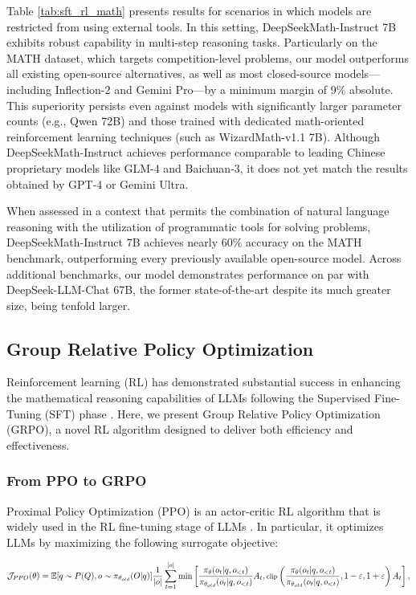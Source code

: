 \begin{itemize}[topsep=0pt]
Table \ref{tab:sft_rl_math} presents results for scenarios in which models are restricted from using external tools. In this setting, DeepSeekMath-Instruct 7B exhibits robust capability in multi-step reasoning tasks. Particularly on the MATH dataset, which targets competition-level problems, our model outperforms all existing open-source alternatives, as well as most closed-source models—including Inflection-2 and Gemini Pro—by a minimum margin of 9\% absolute. This superiority persists even against models with significantly larger parameter counts (e.g., Qwen 72B) and those trained with dedicated math-oriented reinforcement learning techniques (such as WizardMath-v1.1 7B). Although DeepSeekMath-Instruct achieves performance comparable to leading Chinese proprietary models like GLM-4 and Baichuan-3, it does not yet match the results obtained by GPT-4 or Gemini Ultra.

When assessed in a context that permits the combination of natural language reasoning with the utilization of programmatic tools for solving problems, DeepSeekMath-Instruct 7B achieves nearly 60\% accuracy on the MATH benchmark, outperforming every previously available open-source model. Across additional benchmarks, our model demonstrates performance on par with DeepSeek-LLM-Chat 67B, the former state-of-the-art despite its much greater size, being tenfold larger.

\subsection{Group Relative Policy Optimization} Reinforcement learning (RL) has demonstrated substantial success in enhancing the mathematical reasoning capabilities of LLMs following the Supervised Fine-Tuning (SFT) phase \citep{wang2023math,wizardmath}. Here, we present Group Relative Policy Optimization (GRPO), a novel RL algorithm designed to deliver both efficiency and effectiveness.

\subsubsection{From PPO to GRPO} Proximal Policy Optimization (PPO) \citep{schulman2017proximal} is an actor-critic RL algorithm that is widely used in the RL fine-tuning stage of LLMs \citep{ouyang2022training}. In particular, it optimizes LLMs by maximizing the following surrogate objective:

\begin{equation}
\footnotesize
    \mathcal{J}_{PPO}(\theta) = \mathbb{E}{[q \sim P(Q), o \sim \pi_{\theta_{old}}(O|q)]} \frac{1}{|o|} \sum_{t=1}^{|o|} \min \left[ \frac{\pi_\theta(o_{t} | q, o_{<t})}{\pi_{\theta_{old}}(o_{t} | q, o_{<t})} A_{t}, \text{clip} \left( \frac{\pi_\theta(o_{t} | q, o_{<t})}{\pi_{\theta_{old}}(o_{t} | q, o_{<t})}, 1 - \varepsilon, 1 + \varepsilon \right)  A_{t} \right] ,
\end{equation}


\end{itemize}
